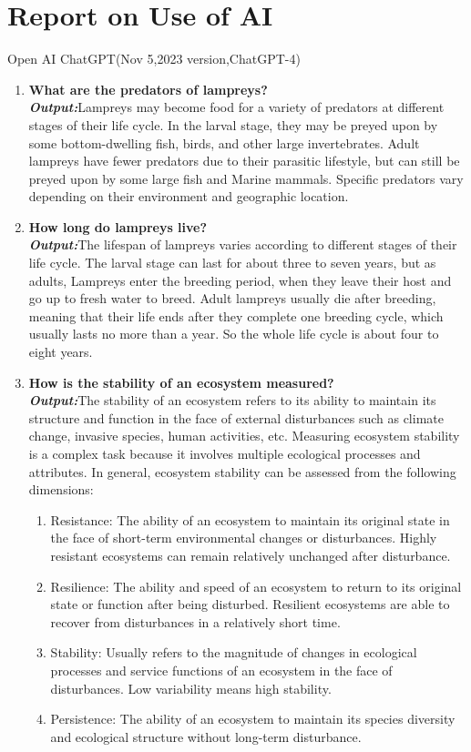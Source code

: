 \documentclass[12pt]{article}  %
\begin{document}
\section*{Report on Use of AI}
Open AI ChatGPT(Nov 5,2023 version,ChatGPT-4)
\begin{enumerate}
	\item \textbf{What are the predators of lampreys?}\\
	\textbf{\textit{Output:}}Lampreys may become food for a variety of predators at different stages of their life cycle. In the larval stage, they may be preyed upon by some bottom-dwelling fish, birds, and other large invertebrates. Adult lampreys have fewer predators due to their parasitic lifestyle, but can still be preyed upon by some large fish and Marine mammals. Specific predators vary depending on their environment and geographic location.
	\item \textbf{How long do lampreys live?}\\
	\textbf{\textit{Output:}}The lifespan of lampreys varies according to different stages of their life cycle. The larval stage can last for about three to seven years, but as adults, Lampreys enter the breeding period, when they leave their host and go up to fresh water to breed. Adult lampreys usually die after breeding, meaning that their life ends after they complete one breeding cycle, which usually lasts no more than a year. So the whole life cycle is about four to eight years.
	\item \textbf{How is the stability of an ecosystem measured?}\\
	\textbf{\textit{Output:}}The stability of an ecosystem refers to its ability to maintain its structure and function in the face of external disturbances such as climate change, invasive species, human activities, etc. Measuring ecosystem stability is a complex task because it involves multiple ecological processes and attributes. In general, ecosystem stability can be assessed from the following dimensions:
	\begin{enumerate}
		\item Resistance: The ability of an ecosystem to maintain its original state in the face of short-term environmental changes or disturbances. Highly resistant ecosystems can remain relatively unchanged after disturbance.
		\item Resilience: The ability and speed of an ecosystem to return to its original state or function after being disturbed. Resilient ecosystems are able to recover from disturbances in a relatively short time.
		\item Stability: Usually refers to the magnitude of changes in ecological processes and service functions of an ecosystem in the face of disturbances. Low variability means high stability.
		\item Persistence: The ability of an ecosystem to maintain its species diversity and ecological structure without long-term disturbance.		
	\end{enumerate}
	
\end{enumerate}
\setcounter{page}{20}
\end{document}
